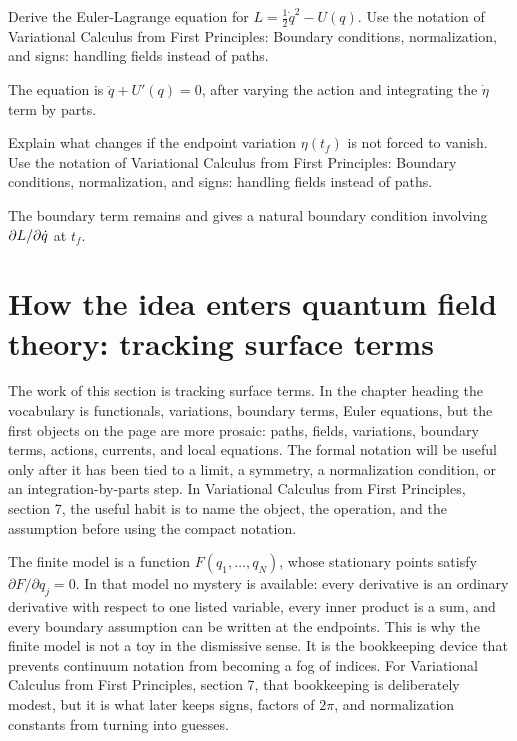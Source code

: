 \begin{exercise}
Derive the Euler-Lagrange equation for \(L=\frac12\dot q^2-U(q)\).  Use the notation of Variational Calculus from First Principles: Boundary conditions, normalization, and signs: handling fields instead of paths.
\begin{answer}
The equation is \(\ddot q+U'(q)=0\), after varying the action and integrating the \(\dot\eta\) term by parts.
\end{answer}
\end{exercise}

\begin{exercise}
Explain what changes if the endpoint variation \(\eta(t_f)\) is not forced to vanish.  Use the notation of Variational Calculus from First Principles: Boundary conditions, normalization, and signs: handling fields instead of paths.
\begin{answer}
The boundary term remains and gives a natural boundary condition involving \(\partial L/\partial\dot q\) at \(t_f\).
\end{answer}
\end{exercise}



\section{How the idea enters quantum field theory: tracking surface terms}

The work of this section is tracking surface terms.  In the chapter heading the vocabulary is functionals, variations, boundary terms, Euler equations, but the first objects on the page are more prosaic: paths, fields, variations, boundary terms, actions, currents, and local equations.  The formal notation will be useful only after it has been tied to a limit, a symmetry, a normalization condition, or an integration-by-parts step.  In Variational Calculus from First Principles, section 7, the useful habit is to name the object, the operation, and the assumption before using the compact notation.

The finite model is a function \(F(q_1,\ldots,q_N)\), whose stationary points satisfy \( \partial F/\partial q_j=0 \).  In that model no mystery is available: every derivative is an ordinary derivative with respect to one listed variable, every inner product is a sum, and every boundary assumption can be written at the endpoints.  This is why the finite model is not a toy in the dismissive sense.  It is the bookkeeping device that prevents continuum notation from becoming a fog of indices.  For Variational Calculus from First Principles, section 7, that bookkeeping is deliberately modest, but it is what later keeps signs, factors of \(2\pi\), and normalization constants from turning into guesses.

